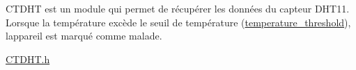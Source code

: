 CTDHT est un module qui permet de récupérer les données du capteur DHT11. Lorsque la température excède le seuil de température (\mbox{\hyperlink{_c_t_s_p_i_f_f_s_8h_a0037b5d48f54912d2dbe7da71d80e7c6}{temperature\+\_\+threshold}}), l\textquotesingle{}appareil est marqué comme malade.

\mbox{\hyperlink{_c_t_d_h_t_8h}{CTDHT.\+h}} 